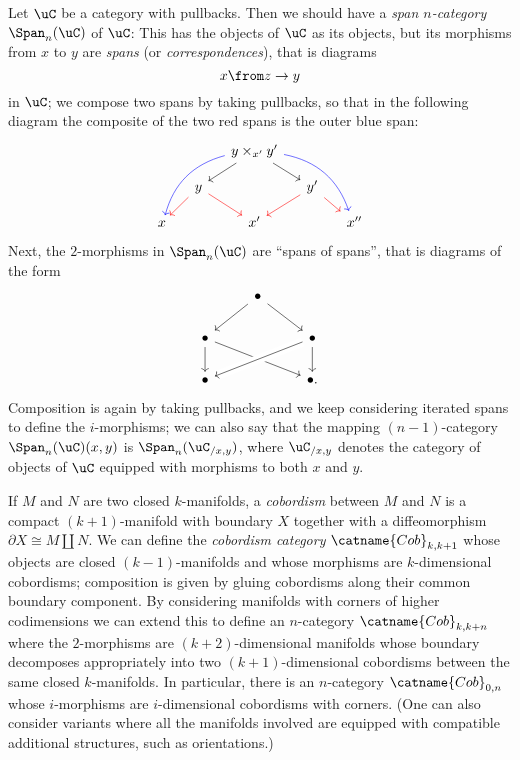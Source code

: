 \documentclass[a4paper,12pt]{article}
\begin{document}
\begin{ex}\label{ex:span}
  Let $\uC$ be a category with pullbacks. Then we should have a
  \emph{span $n$-category} $\Span_{n}(\uC)$ of $\uC$: This has the
  objects of $\uC$ as its objects, but its morphisms from $x$ to $y$
  are \emph{spans} (or \emph{correspondences}), that is diagrams
  \[ x \from z \to y \]
  in $\uC$; we compose two spans by taking pullbacks, so that in the
  following diagram the
  composite of the two red spans is the outer blue span:
  \[
    \begin{tikzcd}[column sep=small, row sep=small]
        &   & y \times_{x'} y' \ar[dl] \ar[dr] \ar[ddll, color=blue,
        bend right] \ar[ddrr, color=blue, bend left] \\
        & y \ar[dl,color=red] \ar[dr,color=red] & & y'
        \ar[dl,color=red] \ar[dr,color=red] \\
      x & & x' & & x''
    \end{tikzcd}
  \]
  Next, the $2$-morphisms in $\Span_{n}(\uC)$ are ``spans of spans'',
  that is diagrams of the form
  \[
    \begin{tikzcd}
       & \bullet \ar[dl] \ar[dr] \\
      \bullet \ar[d] \ar[drr] & & \bullet \ar[d]  \ar[dll, crossing over] \\
      \bullet & & \bullet.
    \end{tikzcd}
  \]
  Composition is again by taking pullbacks, and we keep considering
  iterated spans to define the $i$-morphisms; we can also say that the
  mapping $(n-1)$-category $\Span_{n}(\uC)(x,y)$ is
  $\Span_{n}(\uC_{/x,y})$, where $\uC_{/x,y}$ denotes the category of
  objects of $\uC$ equipped with morphisms to both $x$ and $y$.
\end{ex}

\begin{ex}\label{ex:cob}
  If $M$ and $N$ are two closed $k$-manifolds, a \emph{cobordism}
  between $M$ and $N$ is a compact $(k+1)$-manifold with boundary $X$
  together with a diffeomorphism $\partial X \cong M \amalg N$. We can
  define the \emph{cobordism category} $\catname{Cob}_{k,k+1}$ whose
  objects are closed $(k-1)$-manifolds and whose morphisms are
  $k$-dimensional cobordisms; composition is given by gluing
  cobordisms along their common boundary component. By considering
  manifolds with corners of higher codimensions we can extend this to
  define an $n$-category $\catname{Cob}_{k,k+n}$ where the $2$-morphisms
  are $(k+2)$-dimensional manifolds whose boundary decomposes
  appropriately into two $(k+1)$-dimensional cobordisms between the
  same closed $k$-manifolds. In particular, there is an $n$-category
  $\catname{Cob}_{0,n}$ whose $i$-morphisms are
  $i$-dimensional cobordisms with corners. (One can also consider
  variants where all the manifolds involved are equipped with
  compatible additional structures, such as orientations.)
\end{ex}
\end{document}
